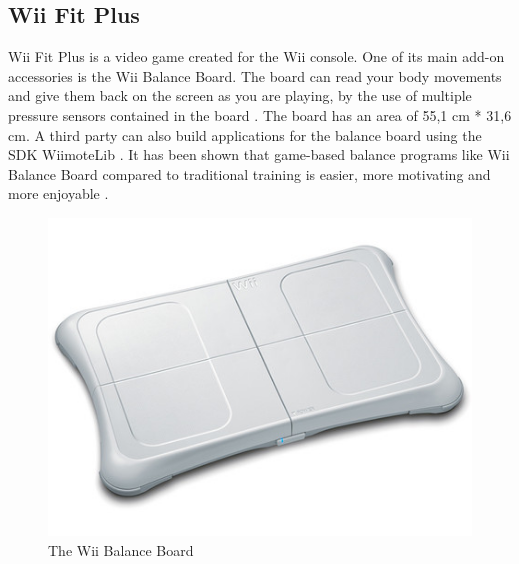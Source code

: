 \subsection{Wii Fit Plus}
Wii Fit Plus is a video game created for the Wii console. One of its main add-on accessories is the Wii Balance Board. The board can read your body movements and give them back on the screen as you are playing, by the use of multiple pressure sensors contained in the board \cite{whatiswiifit}. The board has an area of 55,1 cm {*} 31,6 cm. A third party can also build applications for the balance board using the SDK WiimoteLib \cite{comparison}. It has been shown that game-based balance programs like Wii Balance Board compared to traditional training is easier, more motivating and more enjoyable \cite{taylor2011activity}.
\begin{figure}[h!]
\begin{center}
\includegraphics[scale=0.4]{wiibalance}
\caption[Wii Balance Board]{The Wii Balance Board}
\label{fig:WiiBalanceBoard}
\end{center}
\end{figure}

